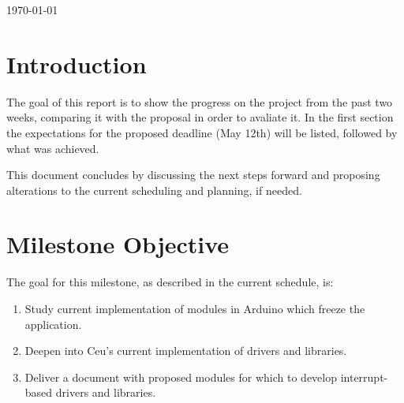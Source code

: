 \documentclass{article}
\begin{document}
\begin{titlepage}

{\large \today}\\[3cm] %


 

\vfill %

\end{titlepage}

\tableofcontents{}

\newpage

\section{Introduction}	


\tab The goal of this report is to show the progress on the project from the past two weeks, comparing it with the proposal in order to avaliate it. In the first section the expectations for the proposed deadline (May 12th) will be listed, followed by what was achieved.
\par This document concludes by discussing the next steps forward and proposing alterations to the current scheduling and planning, if needed.

\section{Milestone Objective}

\tab The goal for this milestone, as described in the current schedule, is:
\begin{enumerate}
	\item Study current implementation of modules in Arduino which freeze the application.
	\item Deepen into Ceu's current implementation of drivers and libraries.
	\item Deliver a document with proposed modules for which to develop interrupt-based drivers and libraries.
\end{enumerate}
\end{document}

